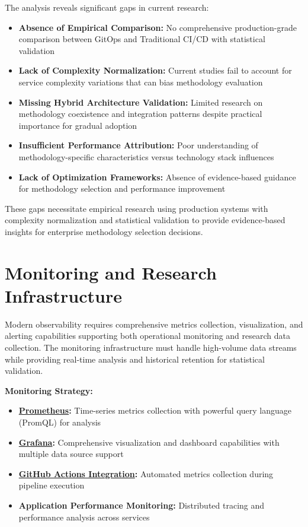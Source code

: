 The analysis reveals significant gaps in current research:

\begin{itemize}
\item \textbf{Absence of Empirical Comparison:} No comprehensive production-grade comparison between GitOps and Traditional CI/CD with statistical validation
\item \textbf{Lack of Complexity Normalization:} Current studies fail to account for service complexity variations that can bias methodology evaluation
\item \textbf{Missing Hybrid Architecture Validation:} Limited research on methodology coexistence and integration patterns despite practical importance for gradual adoption
\item \textbf{Insufficient Performance Attribution:} Poor understanding of methodology-specific characteristics versus technology stack influences
\item \textbf{Lack of Optimization Frameworks:} Absence of evidence-based guidance for methodology selection and performance improvement
\end{itemize}

These gaps necessitate empirical research using production systems with complexity normalization and statistical validation to provide evidence-based insights for enterprise methodology selection decisions.

\section{Monitoring and Research Infrastructure}

Modern observability requires comprehensive metrics collection, visualization, and alerting capabilities supporting both operational monitoring and research data collection. The monitoring infrastructure must handle high-volume data streams while providing real-time analysis and historical retention for statistical validation.

\textbf{Monitoring Strategy:}
\begin{itemize}
\item \textbf{\hyperref[prometheus2023documentation]{Prometheus}:} Time-series metrics collection with powerful query language (PromQL) for analysis
\item \textbf{\hyperref[grafana2023documentation]{Grafana}:} Comprehensive visualization and dashboard capabilities with multiple data source support
\item \textbf{\hyperref[github_actions2023]{GitHub Actions Integration}:} Automated metrics collection during pipeline execution
\item \textbf{Application Performance Monitoring:} Distributed tracing and performance analysis across services
\end{itemize}

